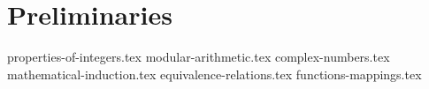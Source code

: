 \chapter{Preliminaries}
{properties-of-integers.tex}
{modular-arithmetic.tex}
{complex-numbers.tex}
{mathematical-induction.tex}
{equivalence-relations.tex}
{functions-mappings.tex}
